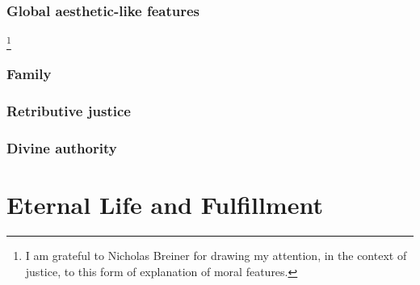 \subsection{Global aesthetic-like features}\footnote{I am grateful to Nicholas Breiner for drawing my attention, in the context of
justice, to this form of explanation of moral features.}
\subsection{Family}
\subsection{Retributive justice}
\subsection{Divine authority}
\chaptertail

\def\mychapter{XI}

\chapter{Eternal Life and Fulfillment}\label{ch:eternal-life}
\chaptertail
